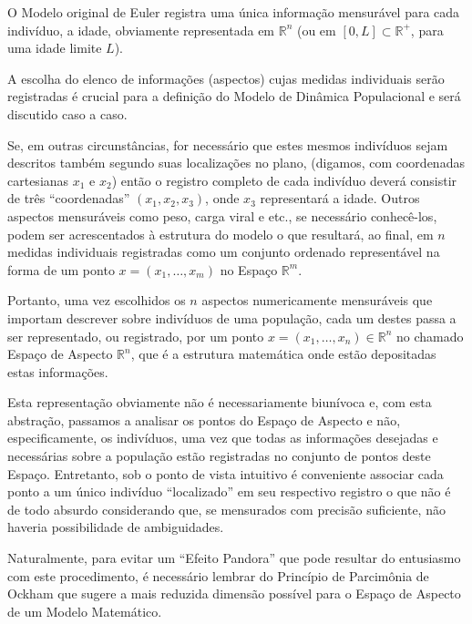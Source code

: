 O Modelo original de Euler registra uma única informação mensurável para cada indivíduo, a idade, obviamente representada em \(\mathbb{R}^n\) (ou em \([0, L] \subset \mathbb{R}^+\), para uma idade limite \(L\)).

A escolha do elenco de informações (aspectos) cujas medidas individuais serão registradas é crucial para a definição do Modelo de Dinâmica Populacional e será discutido caso a caso.

Se, em outras circunstâncias, for necessário que estes mesmos indivíduos sejam descritos também segundo suas localizações no plano, (digamos, com coordenadas cartesianas \(x_1\) e \(x_2\)) então o registro completo de cada indivíduo deverá consistir de três ``coordenadas'' \((x_1, x_2, x_3)\), onde \(x_3\) representará a idade. Outros aspectos mensuráveis como peso, carga viral e etc., se necessário conhecê-los, podem ser acrescentados à estrutura do modelo o que resultará, ao final, em \(n\) medidas individuais registradas como um conjunto ordenado representável na forma de um ponto \(x = (x_1, \ldots, x_m)\) no Espaço \(\mathbb{R}^m\).

Portanto, uma vez escolhidos os \(n\) aspectos numericamente mensuráveis que importam descrever sobre indivíduos de uma população, cada um destes passa a ser representado, ou registrado, por um ponto \(x = (x_1, \ldots, x_n) \in \mathbb{R}^n\) no chamado Espaço de Aspecto \(\mathbb{R}^n\), que é a estrutura matemática onde estão depositadas estas informações.

Esta representação obviamente não é necessariamente biunívoca e, com esta abstração, passamos a analisar os pontos do Espaço de Aspecto e não, especificamente, os indivíduos, uma vez que todas as informações desejadas e necessárias sobre a população estão registradas no conjunto de pontos deste Espaço. Entretanto, sob o ponto de vista intuitivo é conveniente associar cada ponto a um único indivíduo ``localizado'' em seu respectivo registro o que não é de todo absurdo considerando que, se mensurados com precisão suficiente, não haveria possibilidade de ambiguidades.


Naturalmente, para evitar um ``Efeito Pandora'' que pode resultar do entusiasmo com este procedimento, é necessário lembrar do Princípio de Parcimônia de Ockham que sugere a mais reduzida dimensão possível para o Espaço de Aspecto de um Modelo Matemático.

